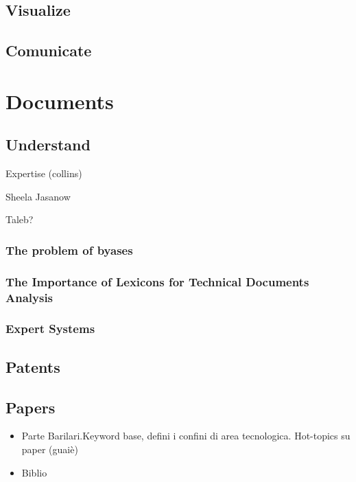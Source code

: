 \documentclass[]{book}
\providecommand{\tightlist}{%
  \setlength{\itemsep}{0pt}\setlength{\parskip}{0pt}}
\begin{document}
\subsection{Visualize}\label{sotatoolsvisualize}

\subsection{Comunicate}\label{sotatoolscomunicate}

\section{Documents}\label{sotadocuments}

\subsection{Understand}\label{sotadocumentsunderstand}

Expertise (collins)

Sheela Jasanow

Taleb?

\subsubsection{The problem of byases}\label{sotadocumentsunderstandbyas}

\subsubsection{The Importance of Lexicons for Technical Documents
Analysis}\label{sotadocumentsunderstandlexicons}

\subsubsection{Expert Systems}\label{expert-systems}

\subsection{Patents}\label{sotadocumentspatents}

\subsection{Papers}\label{sotadocumentspapers}

\begin{itemize}
\tightlist
\item
  Parte Barilari.Keyword base, defini i confini di area tecnologica.
  Hot-topics su paper (guaiè)
\item
  Biblio
\end{itemize}
\end{document}
